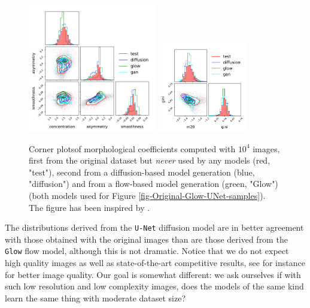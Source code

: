 \documentclass[11pt]{amsart}
\begin{document}
\begin{figure}
    \centering
		\includegraphics[width=0.5\textwidth]{fig-CAS-all.pdf}
		\includegraphics[width=0.35\textwidth]{fig-gini-m20-all.pdf}
	\caption{Corner plots\protect\footnotemark of morphological coefficients computed with $10^4$ images, first from the original dataset but \textit{never} used by any models (red, "test"), second from a diffusion-based model generation (blue, "diffusion") and from a flow-based model generation (green, "Glow") (both models used for Figure \ref{fig-Original-Glow-UNet-samples}). The figure has been inspired by \cite{HACKSTEIN2023100685}.}
	\label{fig-morpho-coeff}
\end{figure}
The distributions derived from the \texttt{U-Net} diffusion model are in better agreement with those obtained with the original images than are those derived from the \texttt{Glow} flow model, although this is not dramatic.
Notice that we do not expect high quality images as well as state-of-the-art competitive results, see for instance \citep{ravanbakhsh2016,Fussell2019,Lanusse2021,smith2021,HACKSTEIN2023100685} for better image quality. Our goal is somewhat different: we ask ourselves if with such low resolution and low complexity images, does the models of the same kind learn the same thing with moderate dataset size?
%
\end{document}
